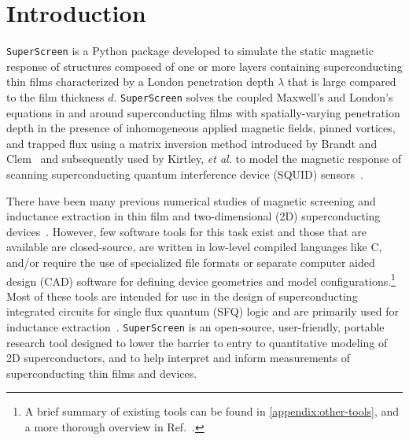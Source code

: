 \documentclass[final,3p,times,twocolumn]{elsarticle}
\newcommand{\inline}[1]{\texttt{#1}\xspace}
\newcommand{\SuperScreen}{\inline{SuperScreen}}
\begin{document}
\begin{small}
\end{small}

\section{Introduction}
\label{section:introduction}

\SuperScreen is a Python package developed to simulate the static magnetic response of structures composed of one or more layers containing superconducting thin films characterized by a London penetration depth $\lambda$ that is large compared to the film thickness $d$. \SuperScreen solves the coupled Maxwell's and London's equations in and around superconducting films with spatially-varying penetration depth in the presence of inhomogeneous applied magnetic fields, pinned vortices, and trapped flux using a matrix inversion method introduced by Brandt and Clem~\cite{Brandt2004-ew,Brandt2005-wj} and subsequently used by Kirtley, \emph{et al.} to model the magnetic response of scanning superconducting quantum interference device (SQUID) sensors~\cite{Kirtley2016-zz, Kirtley2016-gt}.

There have been many previous numerical studies of magnetic screening and inductance extraction in thin film and two-dimensional (2D) superconducting devices~\cite{Jaycox1981-zl, Ketchen1982-at, Ketchen2012-mb, Hildebrandt1995-uw, Khapaev1997-kw, Khapaev2001-xq, Khapaev2001-pw, Babaei_Brojeny2003-la, Brandt2004-ew, Brandt2005-wj, Clem2005-ye, Muller2021-ci, Jackman2016-mf}. However, few software tools for this task exist and those that are available are closed-source, are written in low-level compiled languages like C, and/or require the use of specialized file formats or separate computer aided design (CAD) software for defining device geometries and model configurations.\footnote{A brief summary of existing tools can be found in \ref{appendix:other-tools}, and a more thorough overview in Ref.~\cite{Gaj1999-ls}.} Most of these tools are intended for use in the design of superconducting integrated circuits for single flux quantum (SFQ) logic and are primarily used for inductance extraction~\cite{Gaj1999-ls}. \SuperScreen is an open-source, user-friendly, portable research tool designed to lower the barrier to entry to quantitative modeling of 2D superconductors, and to help interpret and inform measurements of superconducting thin films and devices.
\end{document}
